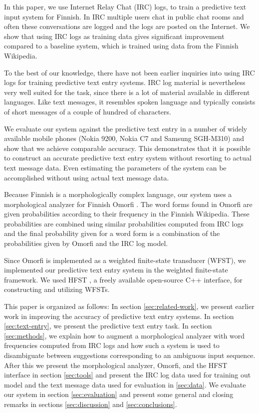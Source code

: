 \documentclass[a4paper,conference]{IEEEtran}
\begin{document}
In this paper, we use Internet Relay Chat (IRC) logs, to train a
predictive text input system for Finnish. In IRC multiple users chat
in public chat rooms and often these conversations are logged and the
logs are posted on the Internet. We show that using IRC logs as
training data gives significant improvement compared to a baseline
system, which is trained using data from the Finnish Wikipedia.

To the best of our knowledge, there have not been earlier inquiries
into using IRC logs for training predictive text entry systems. IRC
log material is nevertheless very well suited for the task, since
there is a lot of material available in different languages. Like text
messages, it resembles spoken language and typically consists of short
messages of a couple of hundred of characters.

We evaluate our system against the predictive text entry in a number
of widely available mobile phones (Nokia 9200, Nokia C7 and Samsung
SGH-M310) and show that we achieve comparable accuracy. This
demonstrates that it is possible to construct an accurate predictive
text entry system without resorting to actual text message data. Even
estimating the parameters of the system can be accomplished without
using actual text message data.

Because Finnish is a morphologically complex language, our system uses
a morphological analyzer for Finnish Omorfi 
\cite{pirinen/2011/nodalida}. The word forms found in Omorfi are given
probabilities according to their frequency in the Finnish
Wikipedia. These probabilities are combined using similar
probabilities computed from IRC logs and the final probability given
for a word form is a combination of the probabilities given by Omorfi
and the IRC log model.

Since Omorfi is implemented as a weighted finite-state transducer
(WFST), we implemented our predictive text entry system in the
weighted finite-state framework. We used HFST
\cite{conf/sfcm/Linden2009}, a freely available open-source C++
interface, for constructing and utilizing WFSTs.

This paper is organized as follows: In section \ref{sec:related-work},
we present earlier work in improving the accuracy of predictive text
entry systems. In section \ref{sec:text-entry}, we present the predictive
text entry task. In section \ref{sec:methods}, we explain how to
augment a morphological analyzer with word frequencies computed from
IRC logs and how such a system is used to disambiguate between
suggestions corresponding to an ambiguous input sequence. After this
we present the morphological analyzer, Omorfi, and the HFST interface
in section \ref{sec:tools} and present the IRC log data used for
training out model and the text message data used for evaluation in
\ref{sec:data}. We evaluate our system in section \ref{sec:evaluation}
and present some general and closing remarks in sections
\ref{sec:discussion} and \ref{sec:conclusions}.
\end{document}

